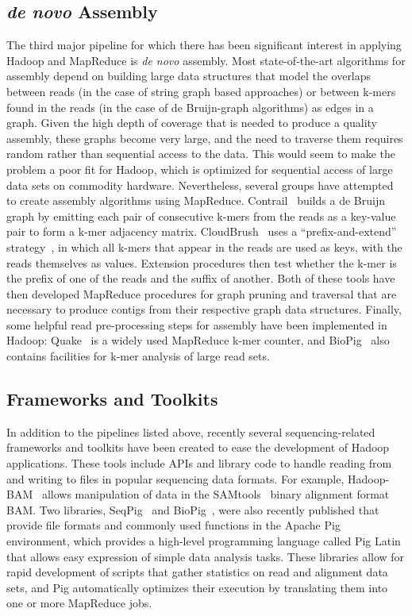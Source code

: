 \subsection{\emph{de novo} Assembly}

The third major pipeline for which there has been significant interest in applying Hadoop and MapReduce is \emph{de novo} assembly. Most state-of-the-art algorithms for assembly depend on building large data structures that model the overlaps between reads (in the case of string graph based approaches) or between k-mers found in the reads (in the case of de Bruijn-graph algorithms) as edges in a graph. Given the high depth of coverage that is needed to produce a quality assembly, these graphs become very large, and the need to traverse them requires random rather than sequential access to the data. This would seem to make the problem a poor fit for Hadoop, which is optimized for sequential access of large data sets on commodity hardware. Nevertheless, several groups have attempted to create assembly algorithms using MapReduce. Contrail~\cite{schatz2010novo} builds a de Bruijn graph by emitting each pair of consecutive k-mers from the reads as a key-value pair to form a k-mer adjacency matrix. CloudBrush~\cite{Chang:2012hd} uses a ``prefix-and-extend'' strategy~\cite{10.1109/CLOUD.2012.123}, in which all k-mers that appear in the reads are used as keys, with the reads themselves as values. Extension procedures then test whether the k-mer is the prefix of one of the reads and the suffix of another. Both of these tools have then developed MapReduce procedures for graph pruning and traversal that are necessary to produce contigs from their respective graph data structures. Finally, some helpful read pre-processing steps for assembly have been implemented in Hadoop: Quake~\cite{Kelley:2010kg} is a widely used MapReduce k-mer counter, and BioPig~\cite{Nordberg:2013ka} also contains facilities for k-mer analysis of large read sets.

\subsection{Frameworks and Toolkits}

In addition to the pipelines listed above, recently several sequencing-related frameworks and toolkits have been created to ease the development of Hadoop applications. These tools include APIs and library code to handle reading from and writing to files in popular sequencing data formats. For example, Hadoop-BAM~\cite{Niemenmaa:2012hu} allows manipulation of data in the SAMtools~\cite{Li:2009vz} binary alignment format BAM. Two libraries, SeqPig~\cite{Schumacher:2013kh} and BioPig~\cite{Nordberg:2013ka}, were also recently published that provide file formats and commonly used functions in the Apache Pig~\cite{pig} environment, which provides a high-level programming language called Pig Latin that allows easy expression of simple data analysis tasks. These libraries allow for rapid development of scripts that gather statistics on read and alignment data sets, and Pig automatically optimizes their execution by translating them into one or more MapReduce jobs. 

